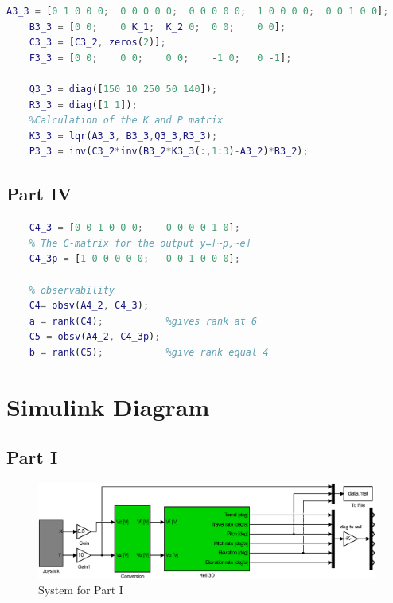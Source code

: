 \medskip
\begin{lstlisting}[caption={MATLAB code showing implimantation of the Marix calculation fpr part 3 problem 3 },label={lst:p3p3},language=Matlab]
    A3_3 = [0 1 0 0 0;  0 0 0 0 0;  0 0 0 0 0;  1 0 0 0 0;  0 0 1 0 0];
    B3_3 = [0 0;    0 K_1;  K_2 0;  0 0;    0 0];
    C3_3 = [C3_2, zeros(2)];
    F3_3 = [0 0;    0 0;    0 0;    -1 0;   0 -1];

    Q3_3 = diag([150 10 250 50 140]);
    R3_3 = diag([1 1]);
    %Calculation of the K and P matrix
    K3_3 = lqr(A3_3, B3_3,Q3_3,R3_3);
    P3_3 = inv(C3_2*inv(B3_2*K3_3(:,1:3)-A3_2)*B3_2);
\end{lstlisting}

\bigskip
\subsection{Part IV}

\begin{lstlisting}[caption={Matlab code showing the calculation of the controllability matrix },label={lst:p4p3},language=Matlab]
    % The C-matrix for the output y=[~e,~lambda]
    C4_3 = [0 0 1 0 0 0;    0 0 0 0 1 0];
    % The C-matrix for the output y=[~p,~e]
    C4_3p = [1 0 0 0 0 0;   0 0 1 0 0 0];
    
    % observability  
    C4= obsv(A4_2, C4_3); 
    a = rank(C4);           %gives rank at 6
    C5 = obsv(A4_2, C4_3p); 
    b = rank(C5);           %give rank equal 4
\end{lstlisting}







\newpage
\section{Simulink Diagram} \label{sec:simulink_diagrams} %
\subsection{Part I}
\begin{figure}[H]\label{sim:part1}
    \begin{center}
    \includegraphics[width=1\linewidth]{Part1_Pictures/p1p4sys.eps}
    \caption{System for Part I}
    \end{center}
\end{figure}

